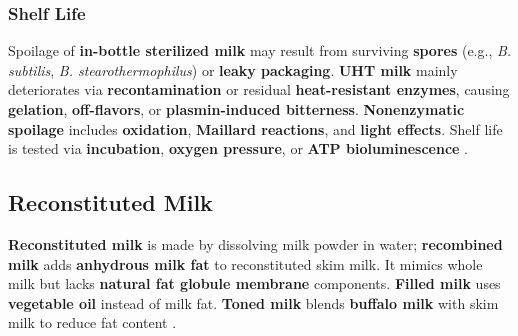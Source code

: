 \subsubsection*{Shelf Life}
Spoilage of \textbf{in-bottle sterilized milk} may result from surviving \textbf{spores} (e.g., \textit{B. subtilis}, \textit{B. stearothermophilus}) or \textbf{leaky packaging}. \textbf{UHT milk} mainly deteriorates via \textbf{recontamination} or residual \textbf{heat-resistant enzymes}, causing \textbf{gelation}, \textbf{off-flavors}, or \textbf{plasmin-induced bitterness}. \textbf{Nonenzymatic spoilage} includes \textbf{oxidation}, \textbf{Maillard reactions}, and \textbf{light effects}. Shelf life is tested via \textbf{incubation}, \textbf{oxygen pressure}, or \textbf{ATP bioluminescence} \cite*{curr_rm_01_dairy_science_technology}.

\subsection{Reconstituted Milk}
\textbf{Reconstituted milk} is made by dissolving milk powder in water; \textbf{recombined milk} adds \textbf{anhydrous milk fat} to reconstituted skim milk. It mimics whole milk but lacks \textbf{natural fat globule membrane} components. \textbf{Filled milk} uses \textbf{vegetable oil} instead of milk fat. \textbf{Toned milk} blends \textbf{buffalo milk} with skim milk to reduce fat content \cite*{curr_rm_01_dairy_science_technology}. 